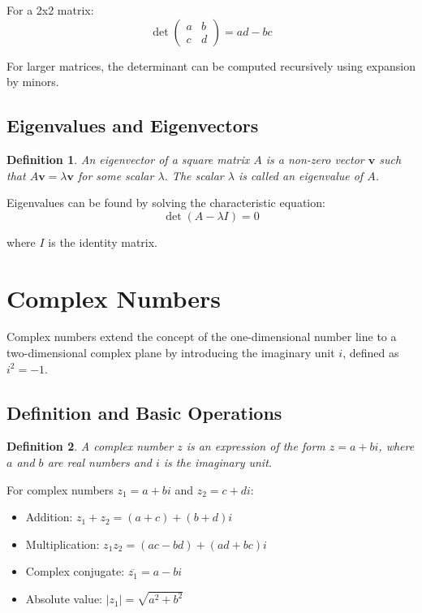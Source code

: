 \documentclass[12pt,a4paper]{article}
\newtheorem{definition}{Definition}
\begin{document}
For a 2x2 matrix:
\[ \det \begin{pmatrix} a & b \\ c & d \end{pmatrix} = ad - bc \]

For larger matrices, the determinant can be computed recursively using expansion by minors.

\subsection{Eigenvalues and Eigenvectors}

\begin{definition}
An eigenvector of a square matrix $A$ is a non-zero vector $\mathbf{v}$ such that $A\mathbf{v} = \lambda\mathbf{v}$ for some scalar $\lambda$. The scalar $\lambda$ is called an eigenvalue of $A$.
\end{definition}

Eigenvalues can be found by solving the characteristic equation:
\[ \det(A - \lambda I) = 0 \]

where $I$ is the identity matrix.

\section{Complex Numbers}

Complex numbers extend the concept of the one-dimensional number line to a two-dimensional complex plane by introducing the imaginary unit $i$, defined as $i^2 = -1$.

\subsection{Definition and Basic Operations}

\begin{definition}
A complex number $z$ is an expression of the form $z = a + bi$, where $a$ and $b$ are real numbers and $i$ is the imaginary unit.
\end{definition}

For complex numbers $z_1 = a + bi$ and $z_2 = c + di$:

\begin{itemize}
    \item Addition: $z_1 + z_2 = (a + c) + (b + d)i$
    \item Multiplication: $z_1z_2 = (ac - bd) + (ad + bc)i$
    \item Complex conjugate: $\overline{z_1} = a - bi$
    \item Absolute value: $|z_1| = \sqrt{a^2 + b^2}$
\end{itemize}
\end{document}

